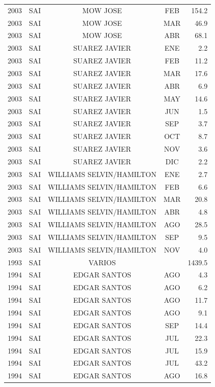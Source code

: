 \documentclass[12pt,]{article}
\begin{document}
\begin{table}[ht]
{\begin{tabular}{lcccr}
  2003 & SAI & MOW JOSE & FEB & 154.2 \\ 
  2003 & SAI & MOW JOSE & MAR & 46.9 \\ 
  2003 & SAI & MOW JOSE & ABR & 68.1 \\ 
  2003 & SAI & SUAREZ JAVIER & ENE & 2.2 \\ 
  2003 & SAI & SUAREZ JAVIER & FEB & 11.2 \\ 
  2003 & SAI & SUAREZ JAVIER & MAR & 17.6 \\ 
  2003 & SAI & SUAREZ JAVIER & ABR & 6.9 \\ 
  2003 & SAI & SUAREZ JAVIER & MAY & 14.6 \\ 
  2003 & SAI & SUAREZ JAVIER & JUN & 1.5 \\ 
  2003 & SAI & SUAREZ JAVIER & SEP & 3.7 \\ 
  2003 & SAI & SUAREZ JAVIER & OCT & 8.7 \\ 
  2003 & SAI & SUAREZ JAVIER & NOV & 3.6 \\ 
  2003 & SAI & SUAREZ JAVIER & DIC & 2.2 \\ 
  2003 & SAI & WILLIAMS SELVIN/HAMILTON & ENE & 2.7 \\ 
  2003 & SAI & WILLIAMS SELVIN/HAMILTON & FEB & 6.6 \\ 
  2003 & SAI & WILLIAMS SELVIN/HAMILTON & MAR & 20.8 \\ 
  2003 & SAI & WILLIAMS SELVIN/HAMILTON & ABR & 4.8 \\ 
  2003 & SAI & WILLIAMS SELVIN/HAMILTON & AGO & 28.5 \\ 
  2003 & SAI & WILLIAMS SELVIN/HAMILTON & SEP & 9.5 \\ 
  2003 & SAI & WILLIAMS SELVIN/HAMILTON & NOV & 4.0 \\ 
  1993 & SAI & VARIOS &  & 1439.5 \\ 
  1994 & SAI & EDGAR SANTOS & AGO & 4.3 \\ 
  1994 & SAI & EDGAR SANTOS & AGO & 6.2 \\ 
  1994 & SAI & EDGAR SANTOS & AGO & 11.7 \\ 
  1994 & SAI & EDGAR SANTOS & AGO & 9.1 \\ 
  1994 & SAI & EDGAR SANTOS & SEP & 14.4 \\ 
  1994 & SAI & EDGAR SANTOS & JUL & 22.3 \\ 
  1994 & SAI & EDGAR SANTOS & JUL & 15.9 \\ 
  1994 & SAI & EDGAR SANTOS & JUL & 43.2 \\ 
  1994 & SAI & EDGAR SANTOS & AGO & 16.8 \\ 

\end{tabular}}
\end{table}
\end{document}
